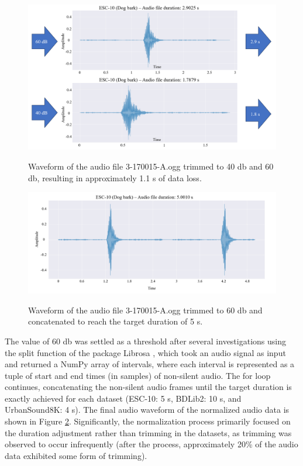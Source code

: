 \begin{figure}[htbp]
    \raggedright
        \caption{Waveform of the audio file 3-170015-A.ogg trimmed to 40 \gls{db} and 60 \gls{db}, resulting in approximately 1.1 \gls{s} of data loss.}
        \includegraphics[width=1\textwidth]{resources/images/050-methods/Methods_normalization_comparison_40db_60db.png}
        \label{fig:methods_normalization_40_db_x_60_db_wave_form}
\end{figure}


\begin{figure}[htbp]
    \raggedright
        \caption{Waveform of the audio file 3-170015-A.ogg trimmed to 60 \gls{db} and concatenated to reach the target duration of 5 \gls{s}.}
        \includegraphics[width=1\textwidth]{resources/images/050-methods/Methods_normalization_normalized.png}
        \label{fig:methods_normalization_normalized_audio_data}
\end{figure}

The value of 60 \gls{db} was settled as a threshold after several investigations using the split function of the package Librosa \cite{McFee2015librosa_sw}, which took an audio signal as input and returned a NumPy array of intervals, where each interval is represented as a tuple of start and end times (in samples) of non-silent audio. The for loop continues, concatenating the non-silent audio frames until the target duration is exactly achieved for each dataset (ESC-10: 5 \gls{s}, BDLib2: 10 \gls{s}, and UrbanSound8K: 4 \gls{s}). The final audio waveform of the normalized audio data is shown in Figure \ref{fig:methods_normalization_normalized_audio_data}. Significantly, the normalization process primarily focused on the duration adjustment rather than trimming in the datasets, as trimming was observed to occur infrequently (after the process, approximately 20\% of the audio data exhibited some form of trimming).


